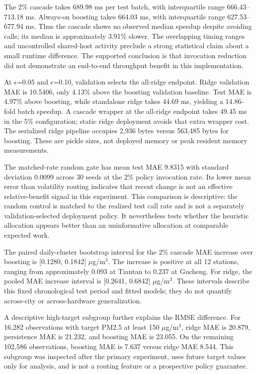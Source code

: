 \documentclass[conference,a4paper]{IEEEtran}
\begin{document}
The 2\% cascade takes 689.98 ms per test batch, with interquartile range 666.43--713.18 ms. Always-on boosting takes 664.03 ms, with interquartile range 627.53--677.94 ms. Thus the cascade shows no observed median speedup despite avoiding calls; its median is approximately 3.91\% slower. The overlapping timing ranges and uncontrolled shared-host activity preclude a strong statistical claim about a small runtime difference. The supported conclusion is that invocation reduction did not demonstrate an end-to-end throughput benefit in this implementation.

At $\epsilon$=0.05 and $\epsilon$=0.10, validation selects the all-ridge endpoint. Ridge validation MAE is 10.5406, only 4.13\% above the boosting validation baseline. Test MAE is 4.97\% above boosting, while standalone ridge takes 44.69 ms, yielding a 14.86-fold batch speedup. A cascade wrapper at the all-ridge endpoint takes 49.45 ms in the 5\% configuration; static ridge deployment avoids that extra wrapper cost. The serialized ridge pipeline occupies 2,936 bytes versus 563,485 bytes for boosting. These are pickle sizes, not deployed memory or peak resident memory measurements.

The matched-rate random gate has mean test MAE 9.8315 with standard deviation 0.0099 across 30 seeds at the 2\% policy invocation rate. Its lower mean error than volatility routing indicates that recent change is not an effective relative-benefit signal in this experiment. This comparison is descriptive: the random control is matched to the realized test call rate and is not a separately validation-selected deployment policy. It nevertheless tests whether the heuristic allocation appears better than an uninformative allocation at comparable expected work.

The paired daily-cluster bootstrap interval for the 2\% cascade MAE increase over boosting is [0.1280, 0.1842] $\mu$g/m$^3$. The increase is positive at all 12 stations, ranging from approximately 0.093 at Tiantan to 0.237 at Gucheng. For ridge, the pooled MAE increase interval is [0.2641, 0.6842] $\mu$g/m$^3$. These intervals describe this fixed chronological test period and fitted models; they do not quantify across-city or across-hardware generalization.

A descriptive high-target subgroup further explains the RMSE difference. For 16,282 observations with target PM2.5 at least 150 $\mu$g/m$^3$, ridge MAE is 20.879, persistence MAE is 21.232, and boosting MAE is 23.055. On the remaining 102,586 observations, boosting MAE is 7.637 versus ridge MAE 8.544. This subgroup was inspected after the primary experiment, uses future target values only for analysis, and is not a routing feature or a prospective policy guarantee.
\end{document}
